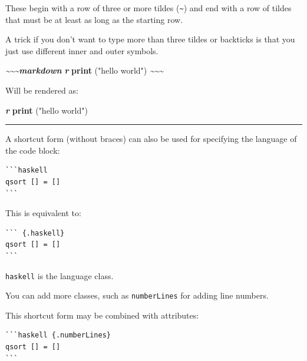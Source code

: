 \documentclass[
  a4paper,
  twoside,
  openright]{book}
\newenvironment{Shaded}{\begin{snugshade}}{\end{snugshade}}
\newcommand{\FunctionTok}[1]{\textcolor[rgb]{0.13,0.29,0.53}{\textbf{#1}}}
\newcommand{\InformationTok}[1]{\textcolor[rgb]{0.56,0.35,0.01}{\textbf{\textit{#1}}}}
\newcommand{\NormalTok}[1]{#1}
\newcommand{\StringTok}[1]{\textcolor[rgb]{0.31,0.60,0.02}{#1}}
\theoremstyle{definition}
\theoremstyle{definition}
\theoremstyle{definition}
\theoremstyle{definition}
\theoremstyle{remark}
\begin{document}
These begin with a row of three or more tildes (\texttt{\textasciitilde{}}) and end with a row of tildes that must be at least as long as the starting row.

A trick if you don't want to type more than three tildes or backticks is that you just use different inner and outer symbols.

\begin{Shaded}
\begin{Highlighting}[]
\InformationTok{\textasciitilde{}\textasciitilde{}\textasciitilde{}markdown}
\InformationTok{\textasciigrave{}\textasciigrave{}\textasciigrave{}r}
\FunctionTok{print}\NormalTok{ (}\StringTok{"hello world"}\NormalTok{)}
\InformationTok{\textasciigrave{}\textasciigrave{}\textasciigrave{}}
\InformationTok{\textasciitilde{}\textasciitilde{}\textasciitilde{}}
\end{Highlighting}
\end{Shaded}

Will be rendered as:

\begin{Shaded}
\begin{Highlighting}[]
\InformationTok{\textasciigrave{}\textasciigrave{}\textasciigrave{}r}
\FunctionTok{print}\NormalTok{ (}\StringTok{"hello world"}\NormalTok{)}
\InformationTok{\textasciigrave{}\textasciigrave{}\textasciigrave{}}
\end{Highlighting}
\end{Shaded}

\begin{center}\rule{0.5\linewidth}{0.5pt}\end{center}

A shortcut form (without braces) can also be used for specifying the language of the code block:

\begin{verbatim}
```haskell
qsort [] = []
```
\end{verbatim}

This is equivalent to:

\begin{verbatim}
``` {.haskell}
qsort [] = []
```
\end{verbatim}

\texttt{haskell} is the language class.

You can add more classes, such as \texttt{numberLines} for adding line numbers.

This shortcut form may be combined with attributes:

\begin{verbatim}
```haskell {.numberLines}
qsort [] = []
```
\end{verbatim}
\end{document}
